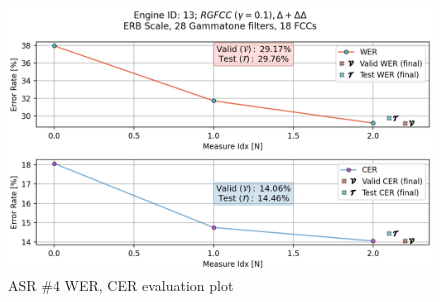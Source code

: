 \begin{figure}[H]
    \centering
    \includegraphics[width=0.95\linewidth]{ASR/images/asr13_wer.png}
    \caption{ASR \#4 WER, CER evaluation plot}\label{fig:wer_13}
\end{figure}













